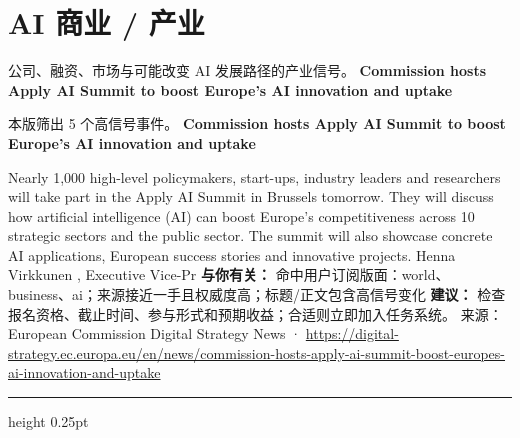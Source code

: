 \documentclass[10.5pt]{ctexart}
\begin{document}
\section*{AI 商业 / 产业}
{\color{ormuted} 公司、融资、市场与可能改变 AI 发展路径的产业信号。}
\vspace{2mm}
{\LARGE\bfseries Commission hosts Apply AI Summit to boost Europe’s AI innovation and uptake}\par
\vspace{1mm}
{\color{ormuted} 本版筛出 5 个高信号事件。}
\vspace{3mm}
{\Large\bfseries Commission hosts Apply AI Summit to boost Europe’s AI innovation and uptake}\par
Nearly 1,000 high-level policymakers, start-ups, industry leaders and researchers will take part in the Apply AI Summit in Brussels tomorrow. They will discuss how artificial intelligence (AI) can boost Europe’s competitiveness across 10 strategic sectors and the public sector. The summit will also showcase concrete AI applications, European success stories and innovative projects. Henna Virkkunen , Executive Vice-Pr
\textbf{与你有关：} 命中用户订阅版面：world、business、ai；来源接近一手且权威度高；标题/正文包含高信号变化
\textbf{建议：} 检查报名资格、截止时间、参与形式和预期收益；合适则立即加入任务系统。
{\footnotesize\color{ormuted} 来源：European Commission Digital Strategy News · \url{https://digital-strategy.ec.europa.eu/en/news/commission-hosts-apply-ai-summit-boost-europes-ai-innovation-and-uptake}}
\vspace{4mm}
\hrule height 0.25pt
\vspace{3mm}
\end{document}
